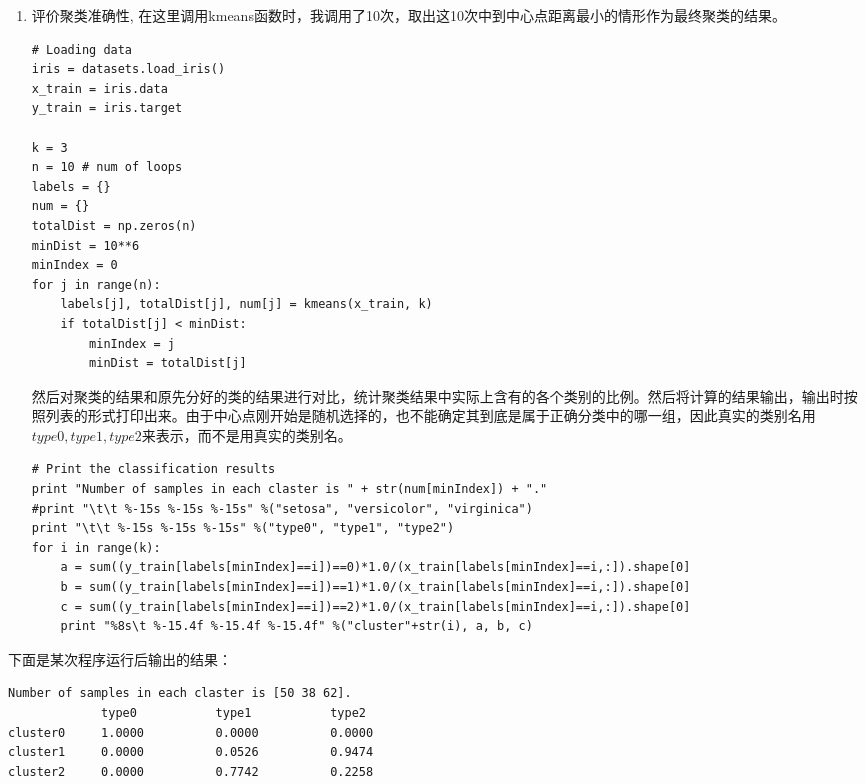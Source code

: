 \documentclass[a4paper, 1pt]{article}
\begin{document}
\begin{spacing}{1.0}
\begin{enumerate}
\begin{lstlisting}
        labels = np.argmin(dist, axis=1)
        newcenter = np.zeros((k,4))
        for i in range(k):
            newcenter[i,:] =  np.average(x_train[labels==i,:], axis=0)
        changed = (newcenter == center).all() == False
        center = newcenter
    # Calculate the number of each group
    num_of_each_type = np.array([x_train[labels == i,:].shape[0] for i in range(k)])
    # Calcultate the total distance of the classification
    totalDistance = 0
    for i in range(k):
        #print sum(labels==i)
        newCenter = np.tile(center[i,:], (sum(labels==i),1))
        #print "dist"+str(np.sum((x_train[labels==i,:]-newCenter)**2,axis=1))
        totalDistance += np.sum((np.sum((x_train[labels==i,:]-newCenter)**2,axis=1)))
    # return type labels and total distance and number of each type
    return labels, np.sqrt(totalDistance), num_of_each_type
\end{lstlisting}
\item 评价聚类准确性, 在这里调用kmeans函数时，我调用了10次，取出这10次中到中心点距离最小的情形作为最终聚类的结果。
\begin{lstlisting}
# Loading data
iris = datasets.load_iris()
x_train = iris.data
y_train = iris.target

k = 3
n = 10 # num of loops
labels = {}
num = {}
totalDist = np.zeros(n)
minDist = 10**6
minIndex = 0
for j in range(n):
    labels[j], totalDist[j], num[j] = kmeans(x_train, k)
    if totalDist[j] < minDist:
        minIndex = j
        minDist = totalDist[j]
\end{lstlisting}
然后对聚类的结果和原先分好的类的结果进行对比，统计聚类结果中实际上含有的各个类别的比例。然后将计算的结果输出，输出时按照列表的形式打印出来。由于中心点刚开始是随机选择的，也不能确定其到底是属于正确分类中的哪一组，因此真实的类别名用$type0, type1, type2$来表示，而不是用真实的类别名。
\begin{lstlisting}
# Print the classification results
print "Number of samples in each claster is " + str(num[minIndex]) + "."
#print "\t\t %-15s %-15s %-15s" %("setosa", "versicolor", "virginica")
print "\t\t %-15s %-15s %-15s" %("type0", "type1", "type2")
for i in range(k):
    a = sum((y_train[labels[minIndex]==i])==0)*1.0/(x_train[labels[minIndex]==i,:]).shape[0]
    b = sum((y_train[labels[minIndex]==i])==1)*1.0/(x_train[labels[minIndex]==i,:]).shape[0]
    c = sum((y_train[labels[minIndex]==i])==2)*1.0/(x_train[labels[minIndex]==i,:]).shape[0]
    print "%8s\t %-15.4f %-15.4f %-15.4f" %("cluster"+str(i), a, b, c)
\end{lstlisting}
\end{enumerate}
下面是某次程序运行后输出的结果：
\begin{lstlisting}
Number of samples in each claster is [50 38 62].
             type0           type1           type2          
cluster0     1.0000          0.0000          0.0000         
cluster1     0.0000          0.0526          0.9474         
cluster2     0.0000          0.7742          0.2258         
\end{lstlisting}


\end{spacing}
\end{document}
